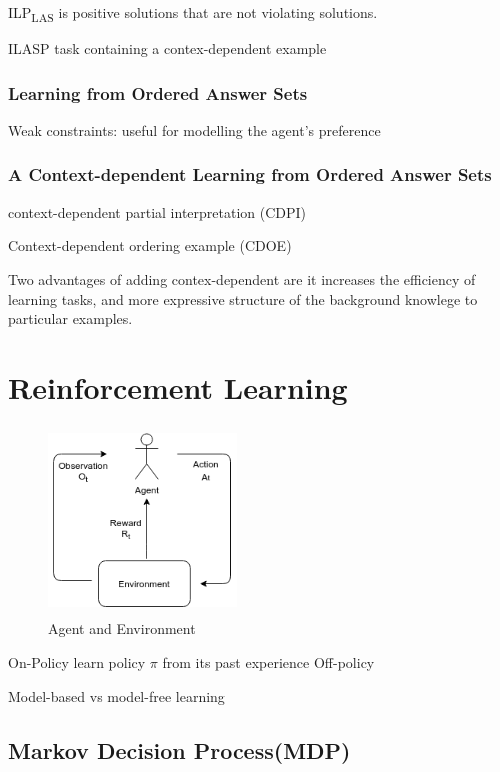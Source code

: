 \documentclass[12pt,twoside]{report}
\begin{document}
ILP\textsubscript{LAS} is positive solutions that are not violating solutions.

ILASP task containing a contex-dependent example

\subsubsection{Learning from Ordered Answer Sets}

Weak constraints: useful for modelling the agent's preference



\subsubsection{A Context-dependent Learning from Ordered Answer Sets}


context-dependent partial interpretation (CDPI)


Context-dependent ordering example (CDOE)

Two advantages of adding contex-dependent are it increases the efficiency of learning tasks, and more expressive structure of the background knowlege to particular examples.


\section{Reinforcement Learning}
\label{rl}

\begin{figure}[!htb]
\centering
\includegraphics[width=5cm, height=5cm]{./figures/agent_env}
\caption{Agent and Environment}
\label{agent_env}
\end{figure}


On-Policy learn policy $\pi$ from its past experience
Off-policy

Model-based vs model-free learning

\subsection{Markov Decision Process(MDP)}
\end{document}
